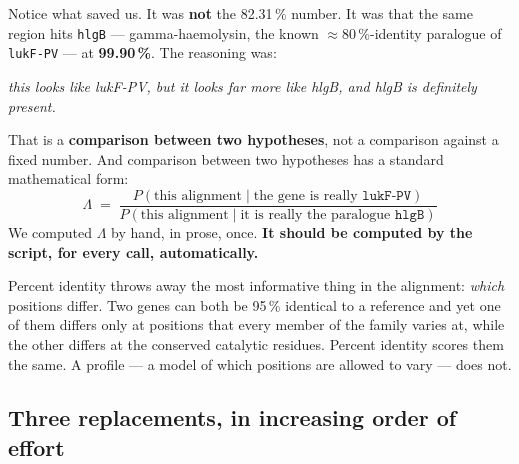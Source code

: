 \begin{alertbox}[title={Why the threshold is the wrong tool, even though it gave the right answer}]
Notice what saved us. It was \textbf{not} the 82.31\,\% number. It was that the same region hits
\texttt{hlgB} --- gamma-haemolysin, the known $\approx$80\,\%-identity paralogue of \texttt{lukF-PV}
--- at \textbf{99.90\,\%}. The reasoning was:
\begin{center}\itshape
this looks like lukF-PV, but it looks far more like hlgB, and hlgB is definitely present.
\end{center}
That is a \textbf{comparison between two hypotheses}, not a comparison against a fixed number. And
comparison between two hypotheses has a standard mathematical form:
\[
\Lambda \;=\;
\frac{P(\text{this alignment}\mid \text{the gene is really }\texttt{lukF-PV})}
     {P(\text{this alignment}\mid \text{it is really the paralogue }\texttt{hlgB})}
\]
We computed $\Lambda$ by hand, in prose, once. \textbf{It should be computed by the script, for every
call, automatically.}
\end{alertbox}

\begin{plain}
Percent identity throws away the most informative thing in the alignment: \emph{which} positions
differ. Two genes can both be 95\,\% identical to a reference and yet one of them differs only at
positions that every member of the family varies at, while the other differs at the conserved
catalytic residues. Percent identity scores them the same. A profile --- a model of which positions
are allowed to vary --- does not.
\end{plain}

\subsection{Three replacements, in increasing order of effort}

